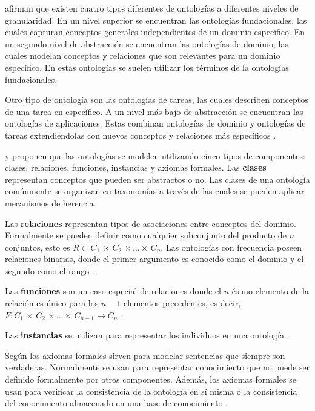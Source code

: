 \cite{Staab2009} afirman que existen cuatro tipos diferentes de ontologías a diferentes niveles de granularidad. En un nivel superior se encuentran las ontologías fundacionales, las cuales capturan conceptos generales independientes de un dominio específico. En un segundo nivel de abstracción se encuentran las ontologías de dominio, las cuales modelan conceptos y relaciones que son relevantes para un dominio específico. En estas ontologías se suelen utilizar los términos de la ontologías fundacionales.

Otro tipo de ontología son las ontologías de tareas, las cuales describen conceptos de una tarea en específico. A un nivel más bajo de abstracción se encuentran las ontologías de aplicaciones. Estas combinan ontologías de dominio y ontologías de tareas extendiéndolas con nuevos conceptos y relaciones más específicos \citep{Staab2009}.

\cite{Gruber1993} y \cite{Gomez-Perez2004} proponen que las ontologías se modelen utilizando cinco tipos de componentes: clases, relaciones, funciones, instancias y axiomas formales. Las \textbf{clases} representan conceptos que pueden ser abstractos o no. Las clases de una ontología comúnmente se organizan en taxonomías a través de las cuales se pueden aplicar mecanismos de herencia.

Las \textbf{relaciones} representan tipos de asociaciones entre conceptos del dominio. Formalmente se pueden definir como cualquier subconjunto del producto de $n$ conjuntos, esto es $R \subset C_1 \,\times \,C_2 \,\times \ldots \times \,C_n$. Las ontologías con frecuencia poseen relaciones binarias, donde el primer argumento es conocido como el dominio y el segundo como el rango \citep{Gomez-Perez2004}.

Las \textbf{funciones} son un caso especial de relaciones donde el $n$-ésimo elemento de la relación es único para los $n-1$ elementos precedentes, es decir, $F: C_1 \,\times \,C_2 \,\times \ldots \times \,C_{n-1} \rightarrow C_n$ \citep{Gomez-Perez2004}.

Las \textbf{instancias} se utilizan para representar los individuos en una ontología \citep{Gomez-Perez2004}.

Según \cite{Gruber1993} los axiomas formales sirven para modelar sentencias que siempre son verdaderas. Normalmente se usan para representar conocimiento que no puede ser definido formalmente por otros componentes. Además, los axiomas formales se usan para verificar la consistencia de la ontología en sí misma o la consistencia del conocimiento almacenado en una base de conocimiento \citep{Gomez-Perez2004}. 

